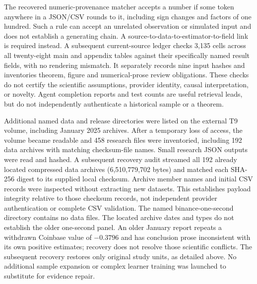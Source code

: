 The recovered numeric-provenance matcher accepts a number if some token anywhere in a JSON/CSV rounds to it, including sign changes and factors of one hundred. Such a rule can accept an unrelated observation or simulated input and does not establish a generating chain. A source-to-data-to-estimator-to-field link is required instead. A subsequent current-source ledger checks 3,135 cells across all twenty-eight main and appendix tables against their specifically named result fields, with no rendering mismatch. It separately records nine input hashes and inventories theorem, figure and numerical-prose review obligations. These checks do not certify the scientific assumptions, provider identity, causal interpretation, or novelty. Agent completion reports and test counts are useful retrieval leads, but do not independently authenticate a historical sample or a theorem.

Additional named data and release directories were listed on the external T9 volume, including January 2025 archives. After a temporary loss of access, the volume became readable and 458 research files were inventoried, including 192 data archives with matching checksum-file names. Small research JSON outputs were read and hashed. A subsequent recovery audit streamed all 192 already located compressed data archives (6,510,779,702 bytes) and matched each SHA-256 digest to its supplied local checksum. Archive member names and initial CSV records were inspected without extracting new datasets. This establishes payload integrity relative to those checksum records, not independent provider authentication or complete CSV validation. The named binance-one-second directory contains no data files. The located archive dates and types do not establish the older one-second panel. An older January report repeats a withdrawn Coinbase value of $-0.3796$ and has conclusion prose inconsistent with its own positive estimates; recovery does not resolve those scientific conflicts. The subsequent recovery restores only original study units, as detailed above. No additional sample expansion or complex learner training was launched to substitute for evidence repair.

